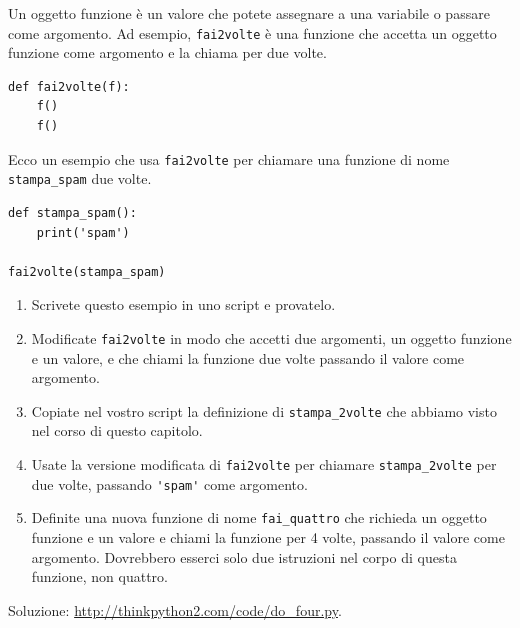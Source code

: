 \documentclass[10pt]{book}
\begin{document}
\vspace{0.2in}
\begin{exercise}

Un oggetto funzione è un valore che potete assegnare a una variabile o passare come argomento. Ad esempio, \verb"fai2volte" è una funzione che accetta un oggetto funzione come argomento e la chiama per due volte.

\begin{verbatim}
def fai2volte(f):
    f()
    f()
\end{verbatim}

Ecco un esempio che usa \verb"fai2volte" per chiamare una funzione di nome \verb"stampa_spam" due volte.

\begin{verbatim}
def stampa_spam():
    print('spam')

fai2volte(stampa_spam)
\end{verbatim}

\begin{enumerate}

\item Scrivete questo esempio in uno script e provatelo.

\item Modificate \verb"fai2volte" in modo che accetti due argomenti, un oggetto funzione e un valore, e che chiami la funzione due volte passando il valore come argomento.

\item Copiate nel vostro script la definizione di \verb"stampa_2volte" che abbiamo visto nel corso di questo capitolo.

\item Usate la versione modificata di \verb"fai2volte" per chiamare
\verb"stampa_2volte" per due volte, passando \verb"'spam'" come argomento.

\item Definite una nuova funzione di nome \verb"fai_quattro" che richieda un oggetto funzione e un valore e chiami la funzione per 4 volte, passando il valore come argomento. Dovrebbero esserci solo due istruzioni nel corpo di questa funzione, non quattro.

\end{enumerate}

Soluzione: \url{http://thinkpython2.com/code/do_four.py}.

\end{exercise}
\end{document}
